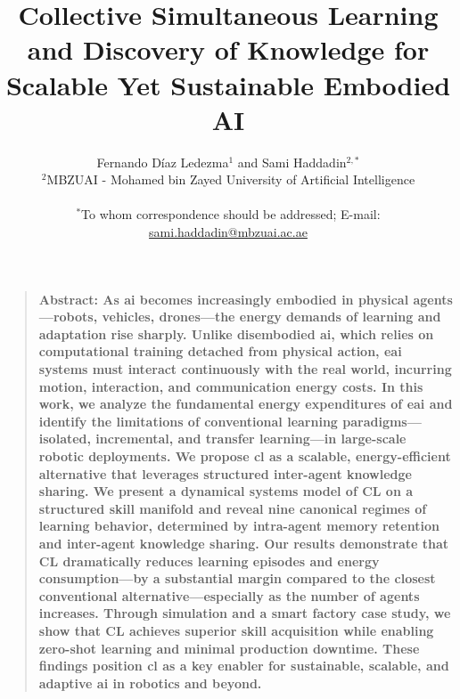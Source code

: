 \documentclass[12pt]{article}
\title{Collective Simultaneous Learning and Discovery of Knowledge for Scalable Yet Sustainable Embodied AI}
\author
{Fernando D\'iaz Ledezma$ {}^{1}$ and Sami Haddadin${}^{2,\ast}$
	\\
	\normalsize{${}^{2}$MBZUAI - Mohamed bin Zayed University of Artificial Intelligence}\\
	\\
	\normalsize{$^\ast$To whom correspondence should be addressed; E-mail: \url{sami.haddadin@mbzuai.ac.ae}}
}
\date{}
\newenvironment{sciabstract}{%
\begin{quote} \bf}
{\end{quote}}
\begin{document}
 

\baselineskip24pt


\maketitle 



\begin{sciabstract}
	\textbf{Abstract:}
As \ac{ai} becomes increasingly embodied in physical agents---robots, vehicles, drones---the energy demands of learning and adaptation rise sharply. Unlike disembodied \ac{ai}, which relies on computational training detached from physical action, \ac{eai} systems must interact continuously with the real world, incurring motion, interaction, and communication energy costs. In this work, we analyze the fundamental energy expenditures of \ac{eai} and identify the limitations of conventional learning paradigms---isolated, incremental, and transfer learning---in large-scale robotic deployments. We propose \ac{cl} as a scalable, energy-efficient alternative that leverages structured inter-agent knowledge sharing. We present a dynamical systems model of CL on a structured skill manifold and reveal nine canonical regimes of learning behavior, determined by intra-agent memory retention and inter-agent knowledge sharing. Our results demonstrate that CL dramatically reduces learning episodes and energy consumption---by a substantial margin compared to the closest conventional alternative---especially as the number of agents increases. Through simulation and a smart factory case study, we show that CL achieves superior skill acquisition while enabling zero-shot learning and minimal production downtime. These findings position \ac{cl} as a key enabler for sustainable, scalable, and adaptive \ac{ai} in robotics and beyond.    
\end{sciabstract}
\end{document}
